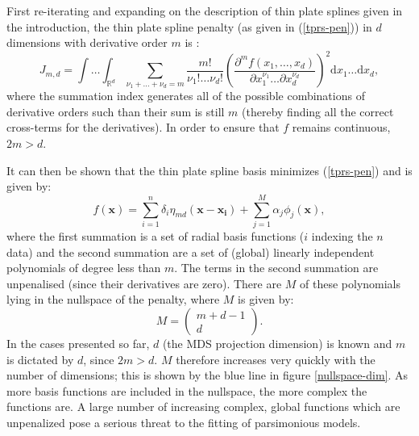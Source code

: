 First re-iterating and expanding on the description of thin plate splines given in the introduction, the thin plate spline penalty (as given in (\ref{tprs-pen})) in $d$ dimensions with derivative order $m$ is :
\begin{equation*}
J_{m,d} = \int \ldots \int_{\mathbb{R}^d} \sum_{\nu_1 + \dots + \nu_d=m} \frac{m!}{\nu_1! \dots \nu_d!} \left( \frac{\partial^m f \left (x_1,\dots,x_d \right )}{\partial x_1^{\nu_1} \ldots  \partial x_d^{\nu_d}} \right)^2 \text{d} x_1 \ldots  \text{d} x_d,
\end{equation*}
where the summation index generates all of the possible combinations of derivative orders such than their sum is still $m$ (thereby finding all the correct cross-terms for the derivatives). In order to ensure that $f$ remains continuous, $2m>d$.

It can then be shown that the thin plate spline basis minimizes (\ref{tprs-pen}) and is given by:
\begin{equation*}
f(\mathbf{x}) = \sum_{i=1}^n \delta_i \eta_{md}(\mathbf{x}-\mathbf{x_i}) + \sum_{j=1}^M \alpha_j \phi_j(\mathbf{x}),
\end{equation*}
where the first summation is a set of radial basis functions ($i$ indexing the $n$ data) and the second summation are a set of (global) linearly independent polynomials of degree less than $m$. The terms in the second summation are unpenalised (since their derivatives are zero).  There are $M$ of these polynomials lying in the nullspace of the penalty, where $M$ is given by:
\begin{equation}
M=\begin{pmatrix} m+d-1 \\ d  \end{pmatrix}.
\label{gds-bigm}
\end{equation}
In the cases presented so far, $d$ (the MDS projection dimension) is known and $m$ is dictated by $d$, since $2m>d$. $M$ therefore increases very quickly with the number of dimensions; this is shown by the blue line in figure \ref{nullspace-dim}. As more basis functions are included in the nullspace, the more complex the functions are. A large number of increasing complex, global functions which are unpenalized pose a serious threat to the fitting of parsimonious models.

